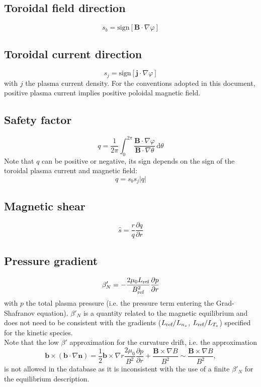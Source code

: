 \documentclass[fleqn]{report}
\begin{document}

\subsection{Toroidal field direction}
$$s_b = \textrm{sign}[\mathbf{B}\cdot\nabla\varphi]$$

\subsection{Toroidal current direction}
$$s_j = \textrm{sign}[\mathbf{j}\cdot\nabla\varphi]$$
with $j$ the plasma current density. For the conventions adopted in this document, positive plasma current implies positive poloidal magnetic field.

\subsection{Safety factor}
$$q=\frac{1}{2\pi}\int_0^{2\pi} \frac{\mathbf{B}\cdot\nabla \varphi}{\mathbf{B}\cdot\nabla \theta}\,\textrm{d}\theta$$
Note that $q$ can be positive or negative, its sign depends on the sign of the toroidal plasma current and magnetic field:
$$q = s_b s_j |q|$$

\subsection{Magnetic shear}
$$\hat{s}=\frac{r}{q}\frac{\partial q}{\partial r}$$


\subsection{Pressure gradient}
$$\beta'_N = -\frac{2\mu_0 L_{\textrm{ref}}}{B_{\textrm{ref}}^2 }\frac{\partial p}{\partial r}$$
with $p$ the total plasma pressure (i.e. the pressure term entering the Grad-Shafranov equation). $\beta'_N$ is a quantity related to the magnetic equilibrium and does not need to be consistent with the gradients ($L_{\textrm{ref}}/L_{n_s}$, $L_{\textrm{ref}}/L_{T_s}$) specified for the kinetic species.\\
Note that the low $\beta'$ approximation for the curvature drift, i.e. the approximation
$$\mathbf{b}\times(\mathbf{b}\cdot\nabla\mathbf{n})=\frac{1}{2}\mathbf{b}\times\nabla r\frac{2\mu_0}{B^2}\frac{\partial p}{\partial r} + \frac{\mathbf{B}\times\nabla B}{B^2} \sim  \frac{\mathbf{B}\times\nabla B}{B^2}, $$
is not allowed in the database as it is inconsistent with the use of a finite $\beta'_N$ for the equilibrium description. 
\end{document}
